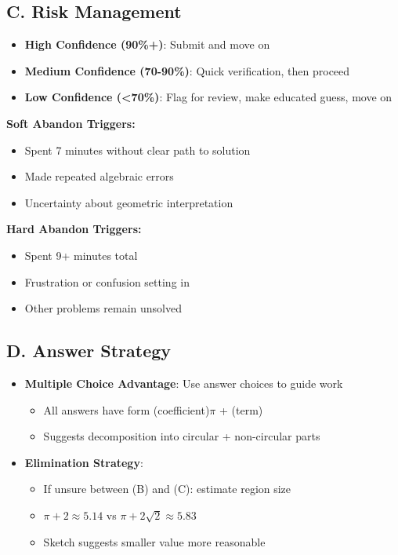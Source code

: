 \documentclass[]{article}
\begin{document}
\begin{competitionbox}
\subsection*{C. Risk Management}
\begin{itemize}[leftmargin=*]
    \item \textbf{High Confidence (90\%+)}: Submit and move on
    \item \textbf{Medium Confidence (70-90\%)}: Quick verification, then proceed
    \item \textbf{Low Confidence (<70\%)}: Flag for review, make educated guess, move on
\end{itemize}

\textbf{Soft Abandon Triggers:}
\begin{itemize}[leftmargin=*]
    \item Spent 7 minutes without clear path to solution
    \item Made repeated algebraic errors
    \item Uncertainty about geometric interpretation
\end{itemize}

\textbf{Hard Abandon Triggers:}
\begin{itemize}[leftmargin=*]
    \item Spent 9+ minutes total
    \item Frustration or confusion setting in
    \item Other problems remain unsolved
\end{itemize}

\subsection*{D. Answer Strategy}
\begin{itemize}[leftmargin=*]
    \item \textbf{Multiple Choice Advantage}: Use answer choices to guide work
    \begin{itemize}
        \item All answers have form (coefficient)$\pi$ + (term)
        \item Suggests decomposition into circular + non-circular parts
    \end{itemize}
    
    \item \textbf{Elimination Strategy}:
    \begin{itemize}
        \item If unsure between (B) and (C): estimate region size
        \item $\pi + 2 \approx 5.14$ vs $\pi + 2\sqrt{2} \approx 5.83$
        \item Sketch suggests smaller value more reasonable
    \end{itemize}
    

\end{itemize}
\end{competitionbox}
\end{document}
